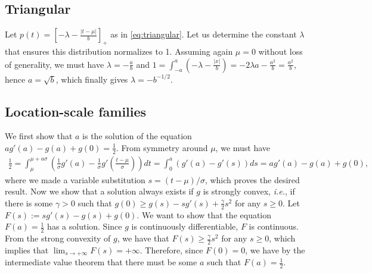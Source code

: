 \documentclass{article}
\newcommand{\remove}[1]{}
\begin{document}
\subsection{Triangular}\label{sec:proof_triangular}

Let $p(t) = \left[-\lambda - \frac{|t-\mu|}{b}\right]_+$ as in \eqref{eq:triangular}.
Let us determine the constant $\lambda$ that ensures this distribution normalizes to 1.
Assuming again $\mu=0$ without loss of generality, we must have
$\lambda = -\frac{a}{b}$ and $1 = \int_{-a}^{a} \left(-\lambda - \frac{|x|}{b}\right) = -2\lambda a - \frac{a^2}{b} = \frac{a^2}{b}$, hence
$a = \sqrt{b}$, which finally gives
$\lambda = -b^{-1/2}$.

\remove{
The negentropy of this distribution is
\begin{eqnarray}
\Omega_2(\hat{p}_{\Omega_2}[f]) &=& -\frac{1}{2} + \frac{1}{2}\int \hat{p}^2_{\Omega_2}[f](x)\nonumber\\
&=& -\frac{1}{2} + \frac{1}{2}\int_{-a}^a \left(-\lambda - \frac{|x|}{b}\right)^2\nonumber\\
&=& -\frac{1}{2} + \frac{1}{2}\int_{-a}^a \left(\lambda^2 +\frac{2\lambda|x|}{b} + \frac{x^2}{b^2} \right)\nonumber\\
&=& -\frac{1}{2} + \lambda^2 a + \frac{\lambda a^2}{b} + \frac{\lambda a^3}{3b^2} \nonumber\\
&=& -\frac{1}{2} +  \frac{a^3}{b^2} - \frac{a^3}{b^2} + \frac{a^3}{3b^2} \nonumber\\
&=& -\frac{1}{2} +  \frac{1}{3\sqrt{b}}.
\end{eqnarray}
}

\subsection{Location-scale families}\label{sec:proof_location_scale}

We first show that $a$ is the solution of the equation $ag'(a) - g(a) + g(0) = \frac{1}{2}$.
From symmetry around $\mu$, we must have
\begin{eqnarray}
\frac{1}{2} = \int_{\mu}^{\mu + a\sigma} \left(\frac{1}{\sigma}g'(a) - \frac{1}{\sigma}g'\left( \frac{t-\mu}{\sigma}\right)\right) dt = \int_{0}^{a} \left(g'(a) - g'(s)\right)  ds = ag'(a) - g(a) + g(0),
\end{eqnarray}
where we made a variable substitution $s = (t-\mu)/\sigma$,
which proves the desired result.
Now we show that a solution always exists if $g$ is strongly convex, {\it i.e.}, if there is some $\gamma>0$ such that
$g(0) \ge g(s) - sg'(s) + \frac{\gamma}{2}s^2$ for any $s \ge 0$.
Let $F(s) := sg'(s) - g(s) + g(0)$. We want to show that the equation $F(a) = \frac{1}{2}$ has a solution. Since $g$ is continuously differentiable, $F$ is continuous.
From the strong convexity of $g$, we have that $F(s) \ge \frac{\gamma}{2}s^2$ for any $s \ge 0$, which implies that $\lim_{s\rightarrow +\infty} F(s) = +\infty$.
Therefore, since $F(0) = 0$, we have by the intermediate value theorem that there must be some $a$ such that $F(a) = \frac{1}{2}$.
\end{document}
